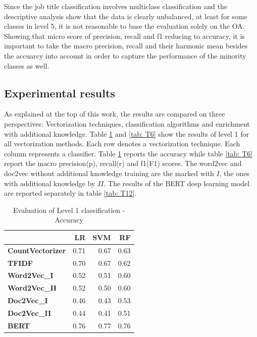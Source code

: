 \documentclass[12pt, a4paper, titlepage]{article}
\begin{document}
Since the job title classification involves multiclass classification and the descriptive analysis show that the data is clearly unbalanced, at least for some classes in level 5, it is not reasonable to base the evaluation solely on the \ac{OA}. Showing that micro score of precision, recall and f1 reducing to accuracy, it is important to take the macro precision, recall and their harmonic mean besides the accuarcy into account in order to capture the performance of the minority classes as well. 


\subsection{Experimental results}

As explained at the top of this work, the results are compared on three perspectives: Vectorization techniques, classification algorithms and enrichment with additional knowledge. Table \ref{tab: T5} and \ref{tab: T6} show the results of level 1 for all vectorization methods. Each row denotes a vectorization technique. Each column represents a classifier. Table \ref{tab: T5} reports the accuracy while table \ref{tab: T6}  report the macro precision(p), recall(r) and f1(F1) scores. The word2vec and doc2vec without additional knowledge training are the marked with $I$, the ones with additional knowledge by $II$. The results of the \ac{BERT} deep learning model are reported separately in table \ref{tab: T12}. 



\begin{table}[hb!]
  \center
\begin{tabular}{lrrr} 
  \hline
  {} &    \textbf{LR} &   \textbf{SVM} &    \textbf{RF} \\
  \hline
  \textbf{CountVectorizer} &  0.71 &  0.67 &  0.63 \\
  \textbf{TFIDF}           &  0.70 &  0.67 &  0.62 \\
  \textbf{Word2Vec\_I}      &  0.52 &  0.51 &  0.60 \\
  \textbf{Word2Vec\_II}     &  0.52 &  0.50 &  0.60 \\
  \textbf{Doc2Vec\_I}       &  0.46 &  0.43 &  0.53 \\
  \textbf{Doc2Vec\_II}      &  0.44 &  0.41 &  0.51 \\
  \textbf{BERT}            &  0.76 &  0.77 &  0.76 \\
  \hline
  \end{tabular}
  \caption{\label{tab: T5} Evaluation of Level 1 classification - Accuracy}
\end{table}
\end{document}
